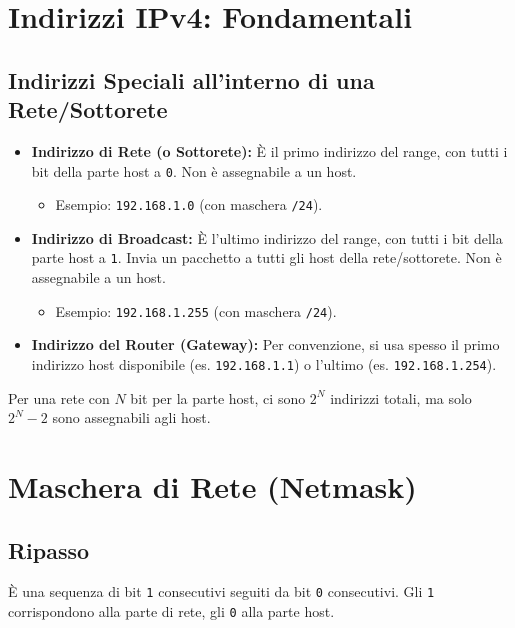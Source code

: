\section{Indirizzi IPv4: Fondamentali}

\subsection{Indirizzi Speciali all'interno di una Rete/Sottorete}
\begin{itemize}
    \item \textbf{Indirizzo di Rete (o Sottorete):} È il primo indirizzo del range, con tutti i bit della parte host a \texttt{0}. Non è assegnabile a un host.
    \begin{itemize}
        \item Esempio: \texttt{192.168.1.0} (con maschera \texttt{/24}).
    \end{itemize}
    \item \textbf{Indirizzo di Broadcast:} È l'ultimo indirizzo del range, con tutti i bit della parte host a \texttt{1}. Invia un pacchetto a tutti gli host della rete/sottorete. Non è assegnabile a un host.
    \begin{itemize}
        \item Esempio: \texttt{192.168.1.255} (con maschera \texttt{/24}).
    \end{itemize}
    \item \textbf{Indirizzo del Router (Gateway):} Per convenzione, si usa spesso il primo indirizzo host disponibile (es. \texttt{192.168.1.1}) o l'ultimo (es. \texttt{192.168.1.254}).
\end{itemize}
Per una rete con $N$ bit per la parte host, ci sono $2^N$ indirizzi totali, ma solo $2^N - 2$ sono assegnabili agli host.

\section{Maschera di Rete (Netmask)}

\subsection{Ripasso}
È una sequenza di bit \texttt{1} consecutivi seguiti da bit \texttt{0} consecutivi. Gli \texttt{1} corrispondono alla parte di rete, gli \texttt{0} alla parte host.

